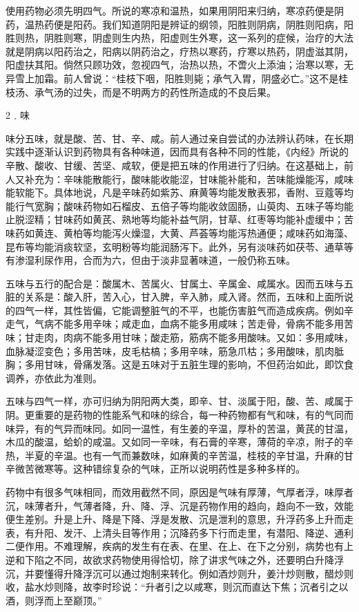 \documentclass[12pt,UTF8]{ctexbook}
\begin{document}
使用药物必须先明四气。所说的寒凉和温热，如果用阴阳来归纳，寒凉药便是阴药，温热药便是阳药。我们知道阴阳是辨证的纲领，阳胜则阴病，阴胜则阳病，阳胜则热，阴胜则寒，阴虚则生内热，阳虚则生外寒，这一系列的症候，治疗的大法就是阴病以阳药治之，阳病以阴药治之，疗热以寒药，疗寒以热药，阴虚滋其阴，阳虚扶其阳。倘然只顾功效，忽视四气，治热以热，不啻火上添油；治寒以寒，无异雪上加霜。前人曾说：“桂枝下咽，阳胜则毙；承气入胃，阴盛必亡。”这不是桂枝汤、承气汤的过失，而是不明两方的药性所造成的不良后果。

2﹒味

味分五味，就是酸、苦、甘、辛、咸。前人通过亲自尝试的办法辨认药味，在长期实践中逐渐认识到药物具有各种味道，因而具有各种不同的性能，《内经》所说的辛散、酸收、甘缓、苦坚、咸软，便是把五味的作用进行了归纳。在这基础上，前人又补充为：辛味能散能行，酸味能收能涩，甘味能补能和，苦味能燥能泻，咸味能软能下。具体地说，凡是辛味药如紫苏、麻黄等均能发散表邪，香附、豆蔻等均能行气宽胸；酸味药物如石榴皮、五倍子等均能收敛固肠，山萸肉、五味子等均能止脱涩精；甘味药如黄芪、熟地等均能补益气阴，甘草、红枣等均能补虚缓中；苦味药如黄连、黄柏等均能泻火燥湿，大黄、芦荟等均能泻热通便；咸味药如海藻、昆布等均能消痰软坚，玄明粉等均能润肠泻下。此外，另有淡味药如茯苓、通草等有渗湿利尿作用，合而为六，但由于淡非显著味道，一般仍称五味。

五味与五行的配合是：酸属木、苦属火、甘属土、辛属金、咸属水。因而五味与五脏的关系是：酸入肝，苦入心，甘入脾，辛入肺，咸入肾。然而，五味和上面所说的四气一样，其性皆偏，它能调整脏气的不平，也能伤害脏气而造成疾病。例如辛走气，气病不能多用辛味；咸走血，血病不能多用咸味；苦走骨，骨病不能多用苦味；甘走肉，肉病不能多用甘味；酸走筋，筋病不能多用酸味。又如：多用咸味，血脉凝涩变色；多用苦味，皮毛枯槁；多用辛味，筋急爪枯；多用酸味，肌肉胝胸；多用甘味，骨痛发落。这是五味对于五脏生理的影响，不但药治如此，即饮食调养，亦依此为准则。

五味与四气一样，亦可归纳为阴阳两大类，即辛、甘、淡属于阳，酸、苦、咸属于阴。更重要的是药物的性能系气和味的综合，每一种药物都有气和味，有的气同而味异，有的气异而味同。如同一温性，有生姜的辛温，厚朴的苦温，黄芪的甘温，木瓜的酸温，蛤蚧的咸温。又如同一辛味，有石膏的辛寒，薄荷的辛凉，附子的辛热，半夏的辛温。也有一气而兼数味，如麻黄的辛苦温，桂枝的辛甘温，升麻的甘辛微苦微寒等。这种错综复杂的气味，正所以说明药性是多种多样的。

药物中有很多气味相同，而效用截然不同，原因是气味有厚薄，气厚者浮，味厚者沉，味薄者升，气薄者降，升、降、浮、沉是药物作用的趋向，趋向不一致，效能便生差别。升是上升、降是下降、浮是发散、沉是泄利的意思，升浮药多上升而走表，有升阳、发汗、上清头目等作用；沉降药多下行而走里，有潜阳、降逆、通利二便作用。不难理解，疾病的发生有在表、在里、在上、在下之分别，病势也有上逆和下陷之不同，故欲求药物使用得恰切，除了讲求气味之外，还要明白升降浮沉，并要懂得升降浮沉可以通过炮制来转化。例如酒炒则升，姜汁炒则散，醋炒则收，盐水炒则降，故李时珍说：“升者引之以咸寒，则沉而直达下焦；沉者引之以酒，则浮而上至巅顶。”
\end{document}
